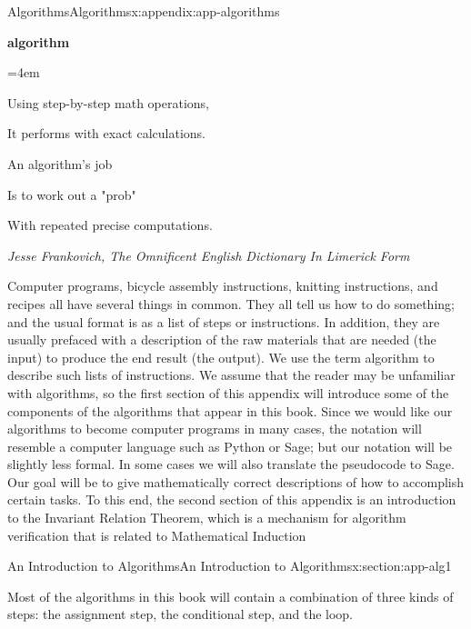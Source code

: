 \documentclass[twoside,10pt,]{book}
\numberwithin{equation}{section}
\newenvironment{poem}{\setlength{\parindent}{0em}}{}
\newcommand{\poemTitle}[1]{\begin{center}\large\textbf{#1}\end{center}}
\newenvironment{stanza}{\vspace{0.25 em}\hangindent=4em}{\vspace{1 em}}
\newcommand{\poemauthorleft}[1]{\vspace{-1em}\begin{flushleft}\textit{#1}\end{flushleft}}
\newcommand{\poemlineleft}[1]{{\raggedright{#1}\par}\vspace{-\parskip}}
\begin{document}
\begin{appendixptx}{Algorithms}{}{Algorithms}{}{}{x:appendix:app-algorithms}
\begin{introduction}{}%
\begin{poem}%
\poemTitle{algorithm}
\begin{stanza}
\poemlineleft{Using step-by-step math operations,}
\poemlineleft{It performs with exact calculations.}
\poemlineleft{An algorithm's job}
\poemlineleft{Is to work out a "prob"}
\poemlineleft{With repeated precise computations.}
\end{stanza}
\poemauthorleft{Jesse Frankovich, The Omnificent English Dictionary In Limerick Form}
\end{poem}
Computer programs, bicycle assembly instructions, knitting instructions, and recipes all have several things in common. They all tell us how to do something; and the usual format is as a list of steps or instructions. In addition, they are usually prefaced with a description of the raw materials that are needed (the input) to produce the end result (the output). We use the term algorithm to describe  such lists of instructions.   We assume that the reader may be unfamiliar with algorithms, so the first section of this appendix will introduce some of the components of the algorithms that appear in this book. Since we would like our algorithms to become computer programs in many cases, the notation will resemble a computer language such as Python or Sage; but our notation will be slightly less formal. In some cases we will also translate the pseudocode to Sage. Our goal will be to give mathematically correct descriptions of how to accomplish certain tasks.  To this end, the second section of this appendix is an introduction to the Invariant Relation Theorem, which is a mechanism for algorithm verification that is related to Mathematical Induction%
\end{introduction}%
%
%
\typeout{************************************************}
\typeout{************************************************}
%
\begin{sectionptx}{An Introduction to Algorithms}{}{An Introduction to Algorithms}{}{}{x:section:app-alg1}
\begin{introduction}{}%
Most of the algorithms in this book will contain a combination of three kinds of steps: the assignment step, the conditional step, and the loop.%
\end{introduction}%
%
%
\typeout{************************************************}

\end{sectionptx}
\end{appendixptx}
\end{document}
